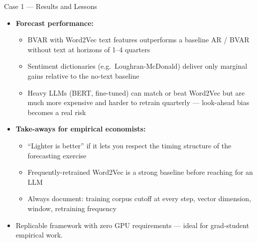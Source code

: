 \documentclass[10pt,english,aspectratio=169]{beamer}
\begin{document}
\begin{frame}{Case 1 --- Results and Lessons}
\begin{itemize}
\item \textbf{Forecast performance:}
\begin{itemize}
    \item BVAR with Word2Vec text features outperforms a baseline AR / BVAR without text at horizons of 1--4 quarters
    \item Sentiment dictionaries (e.g.\ Loughran-McDonald) deliver only marginal gains relative to the no-text baseline
    \item Heavy LLMs (BERT, fine-tuned) can match or beat Word2Vec but are much more expensive and harder to retrain quarterly --- look-ahead bias becomes a real risk
\end{itemize}

\medskip
\item \textbf{Take-aways for empirical economists:}
\begin{itemize}
    \item ``Lighter is better'' if it lets you respect the timing structure of the forecasting exercise
    \item Frequently-retrained Word2Vec is a strong baseline before reaching for an LLM
    \item Always document: training corpus cutoff at every step, vector dimension, window, retraining frequency
\end{itemize}

\medskip
\item Replicable framework with zero GPU requirements --- ideal for grad-student empirical work.
\end{itemize}
\end{frame}
\end{document}
